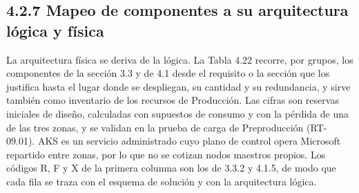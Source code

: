 \documentclass[11pt]{article}
\begin{document}
\subsection{4.2.7 Mapeo de componentes a su arquitectura lógica y física}

La arquitectura física se deriva de la lógica. La Tabla 4.22 recorre, por grupos, los componentes de la sección 3.3 y de 4.1 desde el requisito o la sección que los justifica hasta el lugar donde se despliegan, su cantidad y su redundancia, y sirve también como inventario de los recursos de Producción. Las cifras son reservas iniciales de diseño, calculadas con supuestos de consumo y con la pérdida de una de las tres zonas, y se validan en la prueba de carga de Preproducción (RT-09.01). AKS es un servicio administrado cuyo plano de control opera Microsoft repartido entre zonas, por lo que no se cotizan nodos maestros propios. Los códigos R, F y X de la primera columna son los de 3.3.2 y 4.1.5, de modo que cada fila se traza con el esquema de solución y con la arquitectura lógica.

\clearpage
\end{document}
